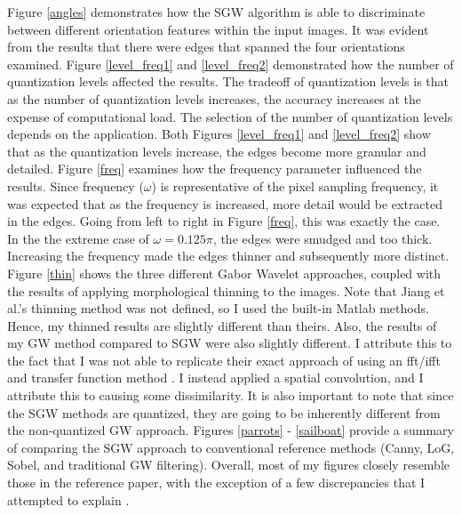 \documentclass[./rarnold_final_project.tex]{subfiles}
\begin{document}
\noindent Figure \ref{angles} demonstrates how the SGW algorithm is able to discriminate between different orientation features within the input images.  It was evident from the results that there were edges that spanned the four orientations examined.  Figure \ref{level_freq1} and \ref{level_freq2} demonstrated how the number of quantization levels affected the results.  The tradeoff of quantization levels is that as the number of quantization levels increases, the accuracy increases at the expense of computational load.  The selection of the number of quantization levels depends on the application.  Both Figures \ref{level_freq1} and \ref{level_freq2} show that as the quantization levels increase, the edges become more granular and detailed. Figure \ref{freq} examines how the frequency parameter influenced the results.  Since frequency ($\omega$) is representative of the pixel sampling frequency, it was expected that as the frequency is increased, more detail would be extracted in the edges.  Going from left to right in Figure \ref{freq}, this was exactly the case.  In the the extreme case of $\omega=0.125\pi$, the edges were smudged and too thick.  Increasing the frequency made the edges thinner and subsequently more distinct.  Figure \ref{thin} shows the three different Gabor Wavelet approaches, coupled with the results of applying morphological thinning to the images.  Note that Jiang et al.'s thinning method was not defined, so I used the built-in Matlab methods.  Hence, my thinned results are slightly different than theirs.  Also, the results of my GW method compared to SGW were also slightly different.  I attribute this to the fact that I was not able to replicate their exact approach of using an fft/ifft and transfer function method \cite{main}. I instead applied a spatial convolution, and I attribute this to causing some dissimilarity.  It is also important to note that since the SGW methods are quantized, they are going to be inherently different from the non-quantized GW approach.
Figures \ref{parrots} - \ref{sailboat} provide a summary of comparing the SGW approach to conventional reference methods (Canny, LoG, Sobel, and traditional GW filtering).  Overall, most of my figures closely resemble those in the reference paper, with the exception of a few discrepancies that I attempted to explain \cite{main}.  
\\ \\
\end{document}

